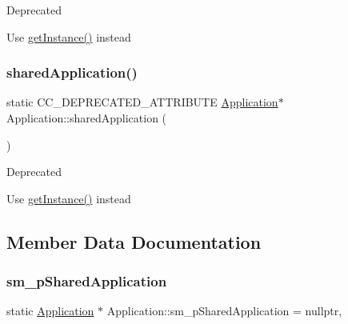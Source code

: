 \begin{DoxyRefDesc}{Deprecated}
\item[\hyperlink{deprecated__deprecated000357}{Deprecated}]Use \hyperlink{classApplication_a723b8bba6edce3769a8d771770ca10e1}{get\+Instance()} instead \end{DoxyRefDesc}
\mbox{\label{classApplication_a13774a693274456e734b221cea01628c}} 
\subsubsection{\texorpdfstring{shared\+Application()}{sharedApplication()}\hspace{0.1cm}{\footnotesize\ttfamily [11/11]}}
{\footnotesize\ttfamily static C\+C\+\_\+\+D\+E\+P\+R\+E\+C\+A\+T\+E\+D\+\_\+\+A\+T\+T\+R\+I\+B\+U\+TE \hyperlink{classApplication}{Application}$\ast$ Application\+::shared\+Application (\begin{DoxyParamCaption}{ }\end{DoxyParamCaption})\hspace{0.3cm}{\ttfamily [static]}}

\begin{DoxyRefDesc}{Deprecated}
\item[\hyperlink{deprecated__deprecated000122}{Deprecated}]Use \hyperlink{classApplication_a723b8bba6edce3769a8d771770ca10e1}{get\+Instance()} instead \end{DoxyRefDesc}


\subsection{Member Data Documentation}
\mbox{\label{classApplication_a5bfb91abd0f08661158fdca1466fc276}} 
\subsubsection{\texorpdfstring{sm\+\_\+p\+Shared\+Application}{sm\_pSharedApplication}}
{\footnotesize\ttfamily static \hyperlink{classApplication}{Application} $\ast$ Application\+::sm\+\_\+p\+Shared\+Application = nullptr\hspace{0.3cm}{\ttfamily [static]}, {\ttfamily [protected]}}



